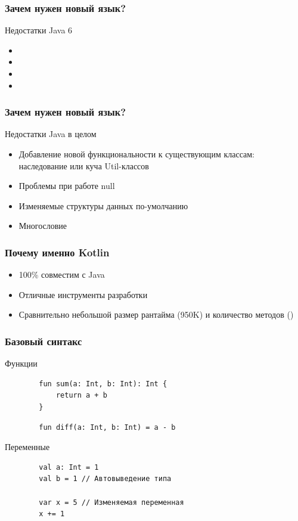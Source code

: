 \documentclass{beamer}
\begin{document}
\begin{frame}
    \frametitle{Зачем нужен новый язык?}
    Недостатки Java 6
    \begin{itemize}
        \item {}
        \item {}
        \item {}
        \item {}
    \end{itemize}
\end{frame}

\begin{frame}
    \frametitle{Зачем нужен новый язык?}
    Недостатки Java в целом
    \begin{itemize}
        \item Добавление новой функциональности к существующим классам:
            наследование или куча Util-классов
        \item Проблемы при работе null
        \item Изменяемые структуры данных по-умолчанию
        \item Многословие
    \end{itemize}
\end{frame}

\begin{frame}
    \frametitle{Почему именно Kotlin}
    \begin{itemize}
        \item 100\% совместим с Java
        \item Отличные инструменты разработки
        \item Сравнительно небольшой размер рантайма (\approx 950K) и количество методов ()
    \end{itemize}
\end{frame}

\begin{frame}[fragile,t]
    \frametitle{Базовый синтакс}
    Функции
    \begin{verbatim}
        fun sum(a: Int, b: Int): Int {
            return a + b
        }
    \end{verbatim}

    \begin{verbatim}
        fun diff(a: Int, b: Int) = a - b
    \end{verbatim}

    Переменные
    \begin{verbatim}
        val a: Int = 1
        val b = 1 // Автовыведение типа

        var x = 5 // Изменяемая переменная
        x += 1
    \end{verbatim}
\end{frame}
\end{document}
